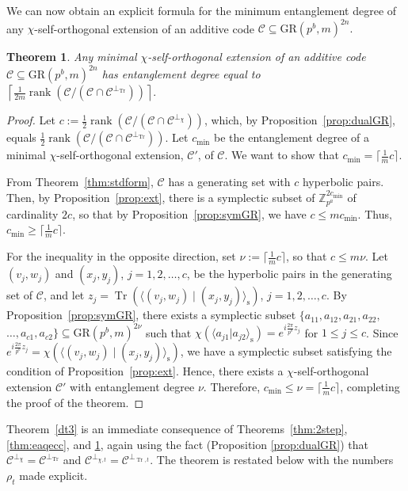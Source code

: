 \documentclass{article}
\DeclareMathOperator{\Tr}{Tr}
\DeclareMathOperator{\rank}{rank}
\newtheorem{thm}{Theorem}[section]
\theoremstyle{remark}
\theoremstyle{definition}
\numberwithin{equation}{section}
\begin{document}
We can now obtain an explicit formula for the minimum entanglement degree of any $\chi$-self-orthogonal extension of an additive code $\mathcal{C} \subseteq \text{GR}(p^b,m)^{2n}.$ 

\begin{thm}\label{EAQZ} Any minimal $\chi$-self-orthogonal extension of an additive code $\mathcal{C} \subseteq \text{GR}(p^b,m)^{2n}$ has entanglement degree equal to $\left\lceil { \frac{1}{2m} \rank(\mathcal{C}/(\mathcal{C} \cap \mathcal{C}^{\perp_{\Tr}}))  }\right\rceil.$ 
\end{thm}
\begin{proof} 
Let $c := \frac12 \rank(\mathcal{C}/(\mathcal{C} \cap \mathcal{C}^{\perp_{{\chi}}}))  $, which, by Proposition~\ref{prop:dualGR}, equals 
$\frac{1}{2}  \rank(\mathcal{C}/(\mathcal{C} \cap \mathcal{C}^{\perp_{\Tr}}))  $. Let $c_{\min}$ be the entanglement degree of a minimal $\chi$-self-orthogonal extension, $\mathcal{C}'$, of $\mathcal{C}$. We want to show that $c_{\min} = \lceil \frac1m c\rceil$.

From Theorem~\ref{thm:stdform}, $\mathcal{C}$ has a generating set with $c$ hyperbolic pairs. Then, by Proposition~\ref{prop:ext}, there is a symplectic subset of $\mathbb{Z}_{p^a}^{2c_{\min}}$ of cardinality $2c$, so that by Proposition~\ref{prop:symGR}, we have $c \le mc_{\min}$. Thus, $c_{\min} \ge \lceil \frac1m c\rceil$.

For the inequality in the opposite direction, set $\nu := \lceil \frac1m c\rceil$, so that $c \le m\nu$. Let $(v_j,w_j)$ and $(x_j,y_j)$, $j = 1,2,\ldots,c$, be the hyperbolic pairs in the generating set of $\mathcal{C}$, and let $z_j = {\Tr}(\langle (v_j,w_j) \mid (x_j,y_j)\rangle_{\mathrm{s}})$, $j=1,2,\ldots,c$. By Proposition~\ref{prop:symGR}, there exists a symplectic subset $\{a_{11},a_{12},a_{21},a_{22},$ $\ldots,a_{c1},a_{c2}\} \subseteq \text{GR}(p^b,m)^{2\nu}$ such that $ \chi(\langle a_{j1} |  a_{j2}\rangle_{\mathrm{s}}) = e^{i \frac{2\pi }{p^b} z_j  }$ for $1\leq j \leq c$. Since $e^{i \frac{2\pi }{p^b} z_j} = \chi(\langle (v_j,w_j) \mid (x_j,y_j)\rangle_{\mathrm{s}})$, we have a symplectic subset satisfying the condition of Proposition~\ref{prop:ext}. Hence, there exists a $\chi$-self-orthogonal extension $\mathcal{C}'$ with entanglement degree $\nu$. Therefore, $c_{\min} \le \nu = \lceil \frac1m c\rceil$, completing the proof of the theorem.
\end{proof}

Theorem~\ref{dt3} is an immediate consequence of Theorems~\ref{thm:2step}, \ref{thm:eaqecc},  and \ref{EAQZ}, again using the fact (Proposition \ref{prop:dualGR}) that $\mathcal{C}^{\perp_\chi} = \mathcal{C}^{\perp_{\Tr}}$ and $\mathcal{C}^{\perp_{\chi,t}}=\mathcal{C}^{\perp_{\Tr,t}}$. The theorem is restated below with the numbers $\rho_t$ made explicit.
\end{document}
